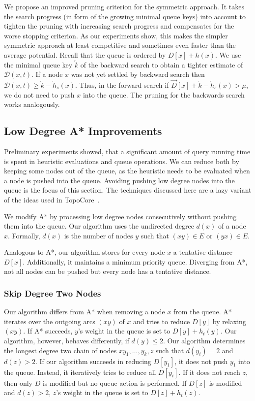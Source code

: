 \documentclass[manuscript,review]{acmart}
\newcommand*{\dist}{\mathcal{D}}
\begin{document}
We propose an improved pruning criterion for the symmetric approach.
It takes the search progress (in form of the growing minimal queue keys) into account to tighten the pruning with increasing search progress and compensates for the worse stopping criterion.
As our experiments show, this makes the simpler symmetric approach at least competitive and sometimes even faster than the average potential.
Recall that the queue is ordered by $D[x] + h(x)$.
We use the minimal queue key $\overleftarrow{k}$ of the backward search to obtain a tighter estimate of $\dist(x,t)$.
If a node $x$ was not yet settled by backward search then $\dist(x,t) \geq \overleftarrow{k} - \overleftarrow{h}_s(x)$.
Thus, in the forward search if $\overrightarrow{D}[x] + \overleftarrow{k} - \overleftarrow{h}_s(x) > \mu$, we do not need to push $x$ into the queue.
The pruning for the backwards search works analogously.

\subsection{Low Degree A* Improvements}\label{sec:low-deg-improvment}

Preliminary experiments showed, that a significant amount of query running time is spent in heuristic evaluations and queue operations.
We can reduce both by keeping some nodes out of the queue, as the heuristic needs to be evaluated when a node is pushed into the queue.
Avoiding pushing low degree nodes into the queue is the focus of this section.
The techniques discussed here are a lazy variant of the ideas used in TopoCore~\cite{DBLP:conf/gis/DibbeltSW15}.

We modify A* by processing low degree nodes consecutively without pushing them into the queue.
Our algorithm uses the undirected degree $d(x)$ of a node $x$.
Formally, $d(x)$ is the number of nodes $y$ such that $(xy)\in E$ or $(yx)\in E$.

Analogous to A*, our algorithm stores for every node $x$ a tentative distance $D[x]$.
Additionally, it maintains a minimum priority queue.
Diverging from A*, not all nodes can be pushed but every node has a tentative distance.

\subsubsection{Skip Degree Two Nodes}

Our algorithm differs from A* when removing a node $x$ from the queue.
A* iterates over the outgoing arcs $(xy)$ of $x$ and tries to reduce $D[y]$ by relaxing $(xy)$.
If A* succeeds, $y$'s weight in the queue is set to $D[y]+h_t(y)$.
Our algorithm, however, behaves differently, if $d(y)\le 2$.
Our algorithm determines the longest degree two chain of nodes $x y_1,\ldots, y_k, z$ such that $d(y_i)=2$ and $d(z) > 2$.
If our algorithm succeeds in reducing $D[y_1]$, it does not push $y_1$ into the queue.
Instead, it iteratively tries to reduce all $D[y_i]$.
If it does not reach $z$, then only $D$ is modified but no queue action is performed.
If $D[z]$ is modified and $d(z)>2$, $z$'s weight in the queue is set to $D[z]+h_t(z)$.
\end{document}
